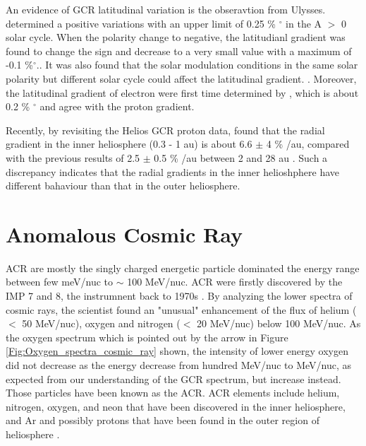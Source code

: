An evidence of \ac{GCR} latitudinal variation is the obseravtion from Ulysses. \citet{Simpson1995GeoRL, Heber1996GeoRL, Heber1996AA} determined a positive variations with an upper limit of 0.25 \% $^\circ$  in the A $>$ 0 solar cycle. When the polarity change to negative, the latitudianl gradient was found to change the sign and decrease to a very small value with a maximum of -0.1 \%$^\circ$.\citep{desimone2011ASTRA, Gieseler2016AA}. It was also found that the solar modulation conditions in the same solar polarity but different solar cycle could affect the latitudinal gradient. \citep{Gieseler2016AA, Vos2016SoPh}. Moreover, the latitudinal gradient of electron were first time determined by \citet{Heber2008ApJ}, which is about 0.2 \% $^\circ$ and agree with the proton gradient.

Recently, by revisiting the Helios GCR proton data, \citet{Marquardt2019AA} found that the radial gradient in the inner heliosphere (0.3 - 1 au) is about 6.6 $\pm$ 4 \% /au, compared with the previous results of 2.5 $\pm$ 0.5 \% /au between 2 and 28 au \citep{Webber1981JGR}. Such a discrepancy indicates that the radial gradients in the inner helioshphere have different bahaviour than that in the outer heliosphere.


\section{Anomalous Cosmic Ray}

\ac{ACR} are mostly the singly charged energetic particle dominated the energy range between few meV/nuc to $\sim$ 100 MeV/nuc. \acs{ACR} were firstly discovered by the \acs{IMP} 7 and 8, the instrumnent back to 1970s \citet{Garcia1973ICRC, Hoverstadt1973PhRvL, McDonald1974ApJ}. By analyzing the lower spectra of cosmic rays, the scientist found an "unusual" enhancement of the flux of helium ($<$ 50 MeV/nuc), oxygen and nitrogen ($<$ 20 MeV/nuc) below 100 MeV/nuc. As the oxygen spectrum which is pointed out by the arrow in Figure \ref{Fig:Oxygen_spectra_cosmic_ray} shown, the intensity of lower energy oxygen did not decrease as the energy decrease from hundred MeV/nuc to MeV/nuc, as expected from our understanding of the \ac{GCR} spectrum, but increase instead. Those particles have been known as the \ac{ACR}. \ac{ACR} elements include helium, nitrogen, oxygen, and neon that have been discovered in the inner heliosphere, and Ar and possibly protons that have been found in the outer region of heliosphere \citet{Klecker1995SSRv}.

